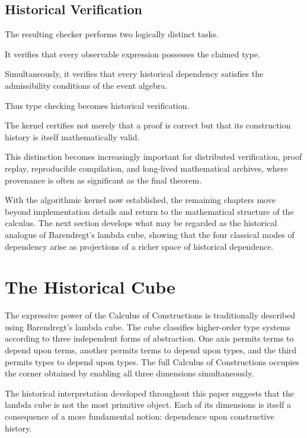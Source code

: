 \documentclass[12pt,oneside]{article}
\theoremstyle{definition}
\theoremstyle{remark}
\begin{document}
\subsection{Historical Verification}

The resulting checker performs two logically distinct tasks.

It verifies that every observable expression possesses the claimed type.

Simultaneously, it verifies that every historical dependency satisfies the
admissibility conditions of the event algebra.

Thus type checking becomes historical verification.

The kernel certifies not merely that a proof is correct but that its
construction history is itself mathematically valid.

This distinction becomes increasingly important for distributed verification,
proof replay, reproducible compilation, and long-lived mathematical archives,
where provenance is often as significant as the final theorem.

With the algorithmic kernel now established, the remaining chapters move beyond
implementation details and return to the mathematical structure of the
calculus. The next section develops what may be regarded as the historical
analogue of Barendregt's lambda cube, showing that the four classical modes of
dependency arise as projections of a richer space of historical dependence.

\section{The Historical Cube}

The expressive power of the Calculus of Constructions is traditionally
described using Barendregt's lambda cube. The cube classifies higher-order type
systems according to three independent forms of abstraction. One axis permits
terms to depend upon terms, another permits terms to depend upon types, and the
third permits types to depend upon types. The full Calculus of Constructions
occupies the corner obtained by enabling all three dimensions
simultaneously.

The historical interpretation developed throughout this paper suggests that the
lambda cube is not the most primitive object. Each of its dimensions is itself
a consequence of a more fundamental notion: dependence upon constructive
history.
\end{document}
